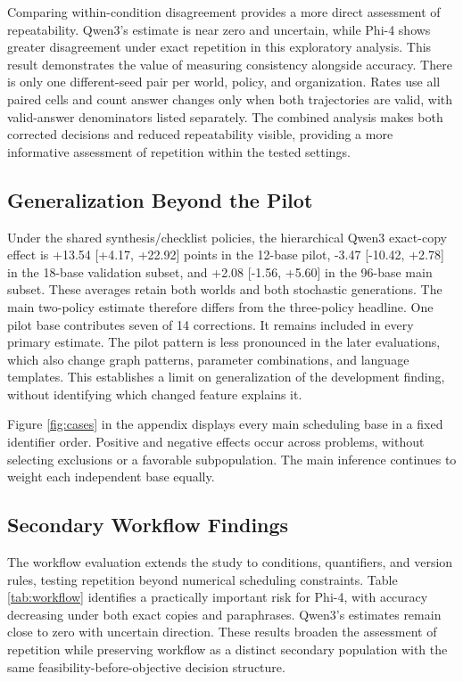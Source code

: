 \documentclass{svproc}
\begin{document}
Comparing within-condition disagreement provides a more direct assessment of
repeatability. Qwen3's estimate is near zero and uncertain, while Phi-4 shows
greater disagreement under exact repetition in this exploratory analysis.
This result demonstrates the value of measuring consistency alongside accuracy.
There is only one different-seed pair per world, policy, and organization.
Rates use all paired cells and count answer changes only when both trajectories
are valid, with valid-answer denominators listed separately. The combined
analysis makes both corrected decisions and reduced repeatability visible,
providing a more informative assessment of repetition within the tested settings.




\subsection{Generalization Beyond the Pilot}
Under the shared synthesis/checklist policies, the hierarchical Qwen3 exact-copy effect is +13.54 [+4.17, +22.92] points in the 12-base pilot, -3.47 [-10.42, +2.78] in the 18-base validation subset, and +2.08 [-1.56, +5.60] in the 96-base main subset. These averages retain both worlds and both stochastic generations. The main two-policy estimate therefore differs from the three-policy headline. One pilot base contributes seven of 14 corrections. It remains included in every primary estimate. The pilot pattern is less pronounced in the later evaluations, which also change graph patterns, parameter combinations, and language templates. This establishes a limit on generalization of the development finding, without identifying which changed feature explains it.

Figure \ref{fig:cases} in the appendix displays every main scheduling base in a
fixed identifier order. Positive and negative effects occur across problems,
without selecting exclusions or a favorable subpopulation. The main inference
continues to weight each independent base equally.




\subsection{Secondary Workflow Findings}
The workflow evaluation extends the study to conditions, quantifiers, and version
rules, testing repetition beyond numerical scheduling constraints.
Table \ref{tab:workflow} identifies a practically important risk for Phi-4,
with accuracy decreasing under both exact copies and paraphrases. Qwen3's
estimates remain close to zero with uncertain direction. These results broaden
the assessment of repetition while preserving workflow as a distinct secondary
population with the same feasibility-before-objective decision structure.
\end{document}
